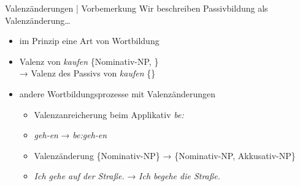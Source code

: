 \begin{frame}
  {Valenzänderungen | Vorbemerkung}
  \onslide<+->
  \onslide<+->
  \alert{Wir beschreiben Passivbildung als Valenzänderung\ldots}\\
  \Halbzeile
  \begin{itemize}[<+->]
    \item im Prinzip eine Art von \alert{Wortbildung}
    \item Valenz von \textit{kaufen} \{\alert{Nominativ-NP}, \}\\
      → Valenz des Passivs von \textit{kaufen} \{\}
      \Halbzeile
    \item andere Wortbildungsprozesse mit Valenzänderungen
      \begin{itemize}[<+->]
        \item Valenzanreicherung beim Applikativ \textit{be:}
        \item \textit{geh-en} → \textit{be:geh-en}
        \item Valenzänderung \{Nominativ-NP\} → \{Nominativ-NP, Akkusativ-NP\}
        \item \textit{Ich gehe auf der Straße.} → \textit{Ich begehe die Straße.}
      \end{itemize}
  \end{itemize}
\end{frame}

